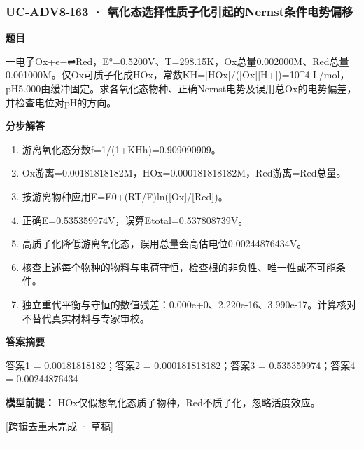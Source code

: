 \documentclass[UTF8,11pt,a4paper]{ctexart}
\begin{document}
\subsubsection*{UC-ADV8-I63 · 氧化态选择性质子化引起的Nernst条件电势偏移}
\noindent\textbf{题目}\par
一电子Ox+e−⇌Red，E°=0.5200V、T=298.15K，Ox总量0.002000M、Red总量0.001000M。仅Ox可质子化成HOx，常数KH=[HOx]/([Ox][H+])=10\textasciicircum{}4 L/mol，pH5.000由缓冲固定。求各氧化态物种、正确Nernst电势及误用总Ox的电势偏差，并检查电位对pH的方向。\par
\medskip\noindent\textbf{分步解答}
\begin{enumerate}
\item 游离氧化态分数f=1/(1+KHh)=0.909090909。
\item Ox游离=0.00181818182M，HOx=0.000181818182M，Red游离=Red总量。
\item 按游离物种应用E=E0+(RT/F)ln([Ox]/[Red])。
\item 正确E=0.535359974V，误算Etotal=0.537808739V。
\item 高质子化降低游离氧化态，误用总量会高估电位0.00244876434V。
\item 核查上述每个物种的物料与电荷守恒，检查根的非负性、唯一性或不可能条件。
\item 独立重代平衡与守恒的数值残差：0.000e+0、2.220e-16、3.990e-17。计算核对不替代真实材料与专家审校。
\end{enumerate}
\noindent\textbf{答案摘要}\par
答案1 = 0.00181818182；答案2 = 0.000181818182；答案3 = 0.535359974；答案4 = 0.00244876434\par
\noindent\textbf{模型前提：}
HOx仅假想氧化态质子物种，Red不质子化，忽略活度效应。\par
\noindent\textcolor{red!65!black}{[跨辑去重未完成 · 草稿]} \par
\medskip\hrule\medskip
{}
\end{document}

